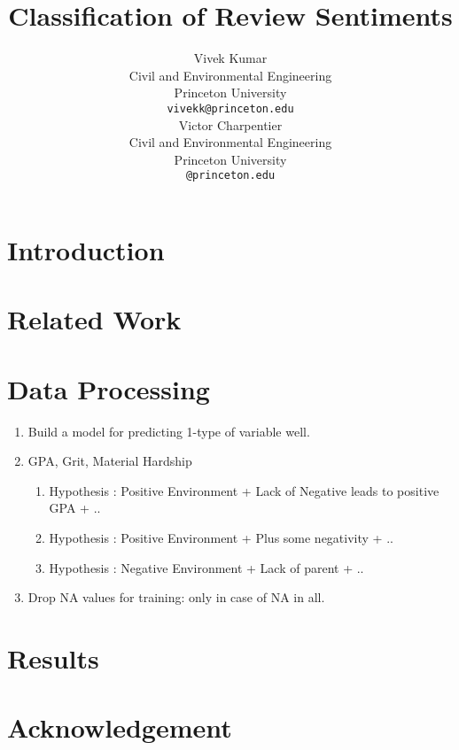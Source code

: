 \documentclass{article} %
\title{Classification of Review Sentiments}
\author{
Vivek Kumar\\
Civil and Environmental Engineering\\
Princeton University\\
\texttt{vivekk@princeton.edu} \\
\And
Victor Charpentier\\
Civil and Environmental Engineering\\
Princeton University\\
\texttt{@princeton.edu} \\
}
\begin{document}
\maketitle

\begin{abstract}
\end{abstract}

\section{Introduction}
\section{Related Work}
\section{Data Processing}
\begin{enumerate}
	\item Build a model for predicting 1-type of variable well.
	\item GPA, Grit, Material Hardship
	\begin{enumerate}
		\item Hypothesis : Positive Environment + Lack of Negative leads to positive GPA + ..
		\item Hypothesis : Positive Environment + Plus some negativity + ..
		\item Hypothesis : Negative Environment + Lack of parent + ..
	\end{enumerate}
	\item Drop NA values for training: only in case of NA in all.
\end{enumerate}
\section{Results}
\section{Acknowledgement}


\end{document}
